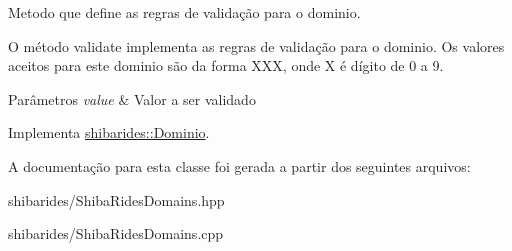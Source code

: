 Metodo que define as regras de validação para o dominio. 

O método validate implementa as regras de validação para o dominio. Os valores aceitos para este dominio são da forma X\+XX, onde X é dígito de 0 a 9.


\begin{DoxyParams}{Parâmetros}
{\em value} & Valor a ser validado \\
\hline
\end{DoxyParams}


Implementa \hyperlink{classshibarides_1_1Dominio_acc9445531455c072bbf708709aebbe55}{shibarides\+::\+Dominio}.



A documentação para esta classe foi gerada a partir dos seguintes arquivos\+:\begin{DoxyCompactItemize}
\item 
shibarides/Shiba\+Rides\+Domains.\+hpp\item 
shibarides/Shiba\+Rides\+Domains.\+cpp\end{DoxyCompactItemize}
